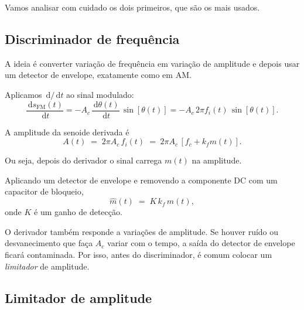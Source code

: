\documentclass[11pt,a4paper]{article}
\newcommand{\FM}{\text{FM}}
\newcommand{\dd}{\,\mathrm{d}}
\begin{document}
Vamos analisar com cuidado os dois primeiros, que são os mais usados.

\subsection{Discriminador de frequência}

A ideia é converter variação de frequência em variação de amplitude e depois usar um detector de envelope, exatamente como em AM.

\begin{center}
\end{center}

\begin{quadro}
Aplicamos $\dd/\dd t$ ao sinal modulado:
\[
  \frac{\dd s_{\FM}(t)}{\dd t}
  = -A_c\,\frac{\dd\theta(t)}{\dd t}\,\sin[\theta(t)]
  = -A_c\,2\pi f_i(t)\,\sin[\theta(t)].
\]

A amplitude da senoide derivada é
\[
  A(t) \;=\; 2\pi A_c\,f_i(t) \;=\; 2\pi A_c\,[f_c + k_f m(t)].
\]

Ou seja, depois do derivador o sinal carrega $m(t)$ na amplitude.

Aplicando um detector de envelope e removendo a componente DC com um capacitor de bloqueio,
\[
  \hat m(t) \;=\; K\,k_f\,m(t),
\]
onde $K$ é um ganho de detecção.
\end{quadro}

\begin{observacao}
O derivador também responde a variações de amplitude. Se houver ruído ou desvanecimento que faça $A_c$ variar com o tempo, a saída do detector de envelope ficará contaminada. Por isso, antes do discriminador, é comum colocar um \emph{limitador} de amplitude.
\end{observacao}

\subsection{Limitador de amplitude}
\end{document}
